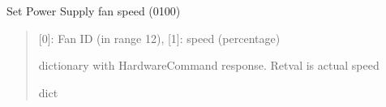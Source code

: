 \documentclass[letterpaper,10pt,english]{sphinxmanual}
\begin{document}
\begin{fulllineitems}
\label{\detokenize{webserverdocs:subrack_hardware.SetPSFanSpeed}}
\pysigstartsignatures
{}
\pysigstopsignatures
\sphinxAtStartPar
Set Power Supply fan speed (0\sphinxhyphen{}100)

\begin{fulllineitems}
\label{\detokenize{webserverdocs:subrack_hardware.SetPSFanSpeed.do}}
\pysigstartsignatures
{}
\pysigstopsignatures\begin{quote}\begin{description}
\sphinxAtStartPar
{} \textendash{} {[}0{]}: Fan ID (in range 1\sphinxhyphen{}2), {[}1{]}: speed (percentage)

\sphinxAtStartPar
dictionary with HardwareCommand response. Retval is actual speed

\sphinxAtStartPar
dict

\end{description}\end{quote}

\end{fulllineitems}


\end{fulllineitems}

\end{document}
